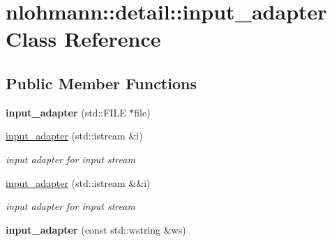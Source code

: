 \hypertarget{classnlohmann_1_1detail_1_1input__adapter}{}\section{nlohmann\+:\+:detail\+:\+:input\+\_\+adapter Class Reference}
\label{classnlohmann_1_1detail_1_1input__adapter}
\subsection*{Public Member Functions}
\begin{DoxyCompactItemize}
\item 
\mbox{\label{classnlohmann_1_1detail_1_1input__adapter_a19fb8c28f37b23099a4353acf0a9a2f1}} 
{\bfseries input\+\_\+adapter} (std\+::\+F\+I\+LE $\ast$file)
\item 
\mbox{\label{classnlohmann_1_1detail_1_1input__adapter_ae89f11268d4724b3080473f7218abe86}} 
\mbox{\hyperlink{classnlohmann_1_1detail_1_1input__adapter_ae89f11268d4724b3080473f7218abe86}{input\+\_\+adapter}} (std\+::istream \&i)
\begin{DoxyCompactList}\small\item\em input adapter for input stream \end{DoxyCompactList}\item 
\mbox{\label{classnlohmann_1_1detail_1_1input__adapter_af002dd2e53ac0855a03cb68d0ce626b2}} 
\mbox{\hyperlink{classnlohmann_1_1detail_1_1input__adapter_af002dd2e53ac0855a03cb68d0ce626b2}{input\+\_\+adapter}} (std\+::istream \&\&i)
\begin{DoxyCompactList}\small\item\em input adapter for input stream \end{DoxyCompactList}\item 
\mbox{\label{classnlohmann_1_1detail_1_1input__adapter_a32f5ddd06562edce43ee86f5b5c2031b}} 
{\bfseries input\+\_\+adapter} (const std\+::wstring \&ws)
\item 
\mbox{\label{classnlohmann_1_1detail_1_1input__adapter_a58163eaa485b17dd878d3c782efc1e43}} 

\end{DoxyCompactItemize}
